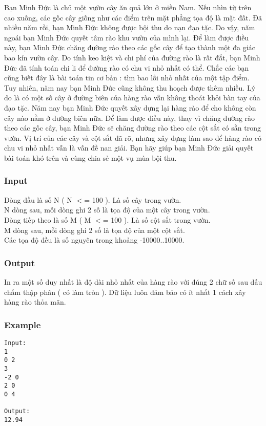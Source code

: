 



   Bạn Minh Đức là chủ một vườn cây ăn quả lớn ở miền Nam. Nếu nhìn từ trên cao xuống, các gốc cây giống như các điểm trên mặt phẳng tọa độ là mặt đất. Đã nhiều năm rồi, bạn Minh Đức không được bội thu do nạn đạo tặc. Do vậy, năm ngoái bạn Minh Đức quyết tâm rào khu vườn của mình lại. Để làm được điều này, bạn Minh Đức chăng đường rào theo các gốc cây để tạo thành một đa giác bao kín vườn cây. Do tính keo kiệt và chi phí của đường rào là rất đắt, bạn Minh Đức đã tính toán chi li để đường rào có chu vi nhỏ nhất có thể. Chắc các bạn cũng biết đây là bài toán tin cơ bản : tìm bao lồi nhỏ nhất của một tập điểm. Tuy nhiên, năm nay bạn Minh Đức cũng không thu hoạch được thêm nhiều. Lý do là có một số cây ở đường biên của hàng rào vẫn không thoát khỏi bàn tay của đạo tặc. Năm nay bạn Minh Đức quyết xây dựng lại hàng rào để cho không còn cây nào nằm ở đường biên nữa. Để làm được điều này, thay vì chăng đường rào theo các gốc cây, bạn Minh Đức sẽ chăng đường rào theo các cột sắt có sẵn trong vườn. Vị trí của các cây và cột sắt đã rõ, nhưng xây dựng làm sao để hàng rào có chu vi nhỏ nhất vẫn là vấn đề nan giải. Bạn hãy giúp bạn Minh Đức giải quyết bài toán khó trên và cùng chia sẻ một vụ mùa bội thu.  

\subsubsection{   Input  }

   Dòng đầu là số N ( N $<$= 100 ). Là số cây trong vườn.   
\\   N dòng sau, mỗi dòng ghi 2 số là tọa độ của một cây trong vườn.   
\\   Dòng tiếp theo là số M ( M $<$= 100 ). Là số cột sắt trong vườn.   
\\   M dòng sau, mỗi dòng ghi 2 số là tọa độ của một cột sắt.   
\\   Các tọa độ đều là số nguyên trong khoảng -10000..10000.  

\subsubsection{   Output  }

   In ra một số duy nhất là độ dài nhỏ nhất của hàng rào với đúng 2 chữ số sau dấu chấm thập phân ( có làm tròn ). Dữ liệu luôn đảm bảo có ít nhất 1 cách xây hàng rào thỏa mãn.  

\subsubsection{   Example  }
\begin{verbatim}
Input:
1
0 2
3
-2 0
2 0
0 4

Output:
12.94
\end{verbatim}